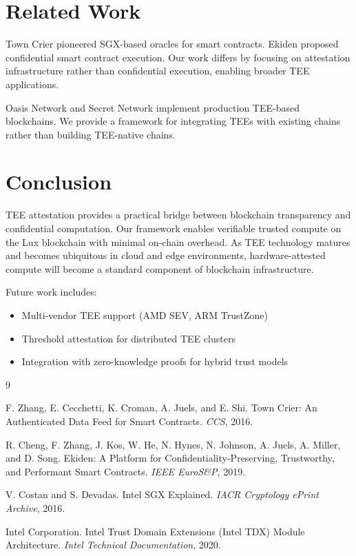 \documentclass[11pt,a4paper]{article}
\theoremstyle{definition}
\begin{document}
\section{Related Work}

Town Crier \cite{towncrier} pioneered SGX-based oracles for smart contracts. Ekiden \cite{ekiden} proposed confidential smart contract execution. Our work differs by focusing on attestation infrastructure rather than confidential execution, enabling broader TEE applications.

Oasis Network and Secret Network implement production TEE-based blockchains. We provide a framework for integrating TEEs with existing chains rather than building TEE-native chains.

\section{Conclusion}

TEE attestation provides a practical bridge between blockchain transparency and confidential computation. Our framework enables verifiable trusted compute on the Lux blockchain with minimal on-chain overhead. As TEE technology matures and becomes ubiquitous in cloud and edge environments, hardware-attested compute will become a standard component of blockchain infrastructure.

Future work includes:
\begin{itemize}
    \item Multi-vendor TEE support (AMD SEV, ARM TrustZone)
    \item Threshold attestation for distributed TEE clusters
    \item Integration with zero-knowledge proofs for hybrid trust models
\end{itemize}


\begin{thebibliography}{9}

F. Zhang, E. Cecchetti, K. Croman, A. Juels, and E. Shi.
Town Crier: An Authenticated Data Feed for Smart Contracts.
\textit{CCS}, 2016.

R. Cheng, F. Zhang, J. Kos, W. He, N. Hynes, N. Johnson, A. Juels, A. Miller, and D. Song.
Ekiden: A Platform for Confidentiality-Preserving, Trustworthy, and Performant Smart Contracts.
\textit{IEEE EuroS\&P}, 2019.

V. Costan and S. Devadas.
Intel SGX Explained.
\textit{IACR Cryptology ePrint Archive}, 2016.

Intel Corporation.
Intel Trust Domain Extensions (Intel TDX) Module Architecture.
\textit{Intel Technical Documentation}, 2020.

\end{thebibliography}
\end{document}
